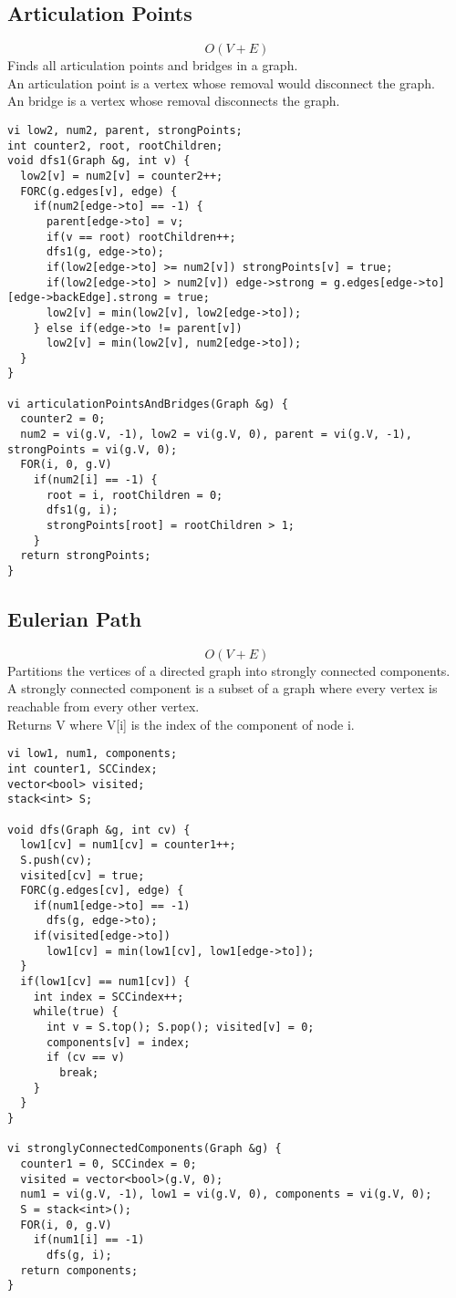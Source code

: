\documentclass[11pt, oneside]{article}
\begin{document}
\subsection{Articulation Points}
\[O(V+E)\]
Finds all articulation points and bridges in a graph.\\
An articulation point is a vertex whose removal would disconnect the graph.\\
An bridge is a vertex whose removal disconnects the graph.\\
\begin{lstlisting}
vi low2, num2, parent, strongPoints;
int counter2, root, rootChildren;
void dfs1(Graph &g, int v) {
  low2[v] = num2[v] = counter2++;
  FORC(g.edges[v], edge) {
    if(num2[edge->to] == -1) {
      parent[edge->to] = v;
      if(v == root) rootChildren++;
      dfs1(g, edge->to);
      if(low2[edge->to] >= num2[v]) strongPoints[v] = true;
      if(low2[edge->to] > num2[v]) edge->strong = g.edges[edge->to][edge->backEdge].strong = true;
      low2[v] = min(low2[v], low2[edge->to]);
    } else if(edge->to != parent[v])
      low2[v] = min(low2[v], num2[edge->to]);
  }
}

vi articulationPointsAndBridges(Graph &g) {
  counter2 = 0;
  num2 = vi(g.V, -1), low2 = vi(g.V, 0), parent = vi(g.V, -1), strongPoints = vi(g.V, 0);
  FOR(i, 0, g.V)
    if(num2[i] == -1) {
      root = i, rootChildren = 0;
      dfs1(g, i);
      strongPoints[root] = rootChildren > 1;
    }
  return strongPoints;
}
\end{lstlisting}

\subsection{Eulerian Path}
\[O(V+E)\]
Partitions the vertices of a directed graph into strongly connected components.\\
A strongly connected component is a subset of a graph where every vertex is reachable from every other vertex.\\
Returns V where V[i] is the index of the component of node i.\\
\begin{lstlisting}
vi low1, num1, components;
int counter1, SCCindex;
vector<bool> visited;
stack<int> S;

void dfs(Graph &g, int cv) {
  low1[cv] = num1[cv] = counter1++;
  S.push(cv);
  visited[cv] = true;
  FORC(g.edges[cv], edge) {
    if(num1[edge->to] == -1)
      dfs(g, edge->to);
    if(visited[edge->to])
      low1[cv] = min(low1[cv], low1[edge->to]);        
  }
  if(low1[cv] == num1[cv]) {
    int index = SCCindex++;
    while(true) {
      int v = S.top(); S.pop(); visited[v] = 0;
      components[v] = index;
      if (cv == v)
        break;
    }
  }
}

vi stronglyConnectedComponents(Graph &g) {
  counter1 = 0, SCCindex = 0;
  visited = vector<bool>(g.V, 0);
  num1 = vi(g.V, -1), low1 = vi(g.V, 0), components = vi(g.V, 0);
  S = stack<int>();
  FOR(i, 0, g.V)
    if(num1[i] == -1)
      dfs(g, i);
  return components;
}
\end{lstlisting}
\end{document}
